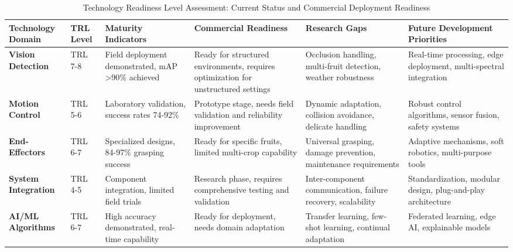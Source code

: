 \begin{table*}[htbp]
\centering
\footnotesize
\caption{Technology Readiness Level Assessment: Current Status and Commercial Deployment Readiness}
\label{tab:technology_maturity_assessment}
\begin{tabular}{@{}p{}p{}p{}p{}p{}p{}@{}}
\toprule
\textbf{Technology Domain} & \textbf{TRL Level} & \textbf{Maturity Indicators} & \textbf{Commercial Readiness} & \textbf{Research Gaps} & \textbf{Future Development Priorities} \\
\midrule

\textbf{Vision Detection} & 
TRL 7-8 & 
Field deployment demonstrated, mAP >90\% achieved \cite{wan2020faster,lawal2021tomato} & 
Ready for structured environments, requires optimization for unstructured settings & 
Occlusion handling, multi-fruit detection, weather robustness & 
Real-time processing, edge deployment, multi-spectral integration \\
\midrule

\textbf{Motion Control} & 
TRL 5-6 & 
Laboratory validation, success rates 74-92\% \cite{bac2014harvesting,yu2019fruit} & 
Prototype stage, needs field validation and reliability improvement & 
Dynamic adaptation, collision avoidance, delicate handling & 
Robust control algorithms, sensor fusion, safety systems \\
\midrule

\textbf{End-Effectors} & 
TRL 6-7 & 
Specialized designs, 84-97\% grasping success \cite{ge2019fruit,jun2021towards} & 
Ready for specific fruits, limited multi-crop capability & 
Universal grasping, damage prevention, maintenance requirements & 
Adaptive mechanisms, soft robotics, multi-purpose tools \\
\midrule

\textbf{System Integration} & 
TRL 4-5 & 
Component integration, limited field trials \cite{kang2020real,ZHOU2024110} & 
Research phase, requires comprehensive testing and validation & 
Inter-component communication, failure recovery, scalability & 
Standardization, modular design, plug-and-play architecture \\
\midrule

\textbf{AI/ML Algorithms} & 
TRL 6-7 & 
High accuracy demonstrated, real-time capability \cite{liu2020yolo,yu2024object} & 
Ready for deployment, needs domain adaptation & 
Transfer learning, few-shot learning, continual adaptation & 
Federated learning, edge AI, explainable models \\

\bottomrule
\end{tabular}
\end{table*}